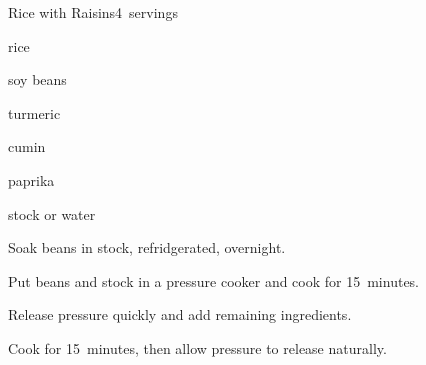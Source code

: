 \begin{recipe}{Rice with Raisins}{}{4~servings}

\begin{ingredients}
\item {} rice
\item \C{\half} 
\item \C{\half} soy beans
\item {} turmeric
\item {} cumin
\item \tp{\half} paprika
\item {} stock or water
\end{ingredients}

\begin{directions}
\item Soak beans in stock, refridgerated, overnight.
\item Put beans and stock in a pressure cooker and cook for 15~minutes.
\item Release pressure quickly and add remaining ingredients.
\item Cook for 15~minutes, then allow pressure to release naturally.
\end{directions}

\end{recipe}
